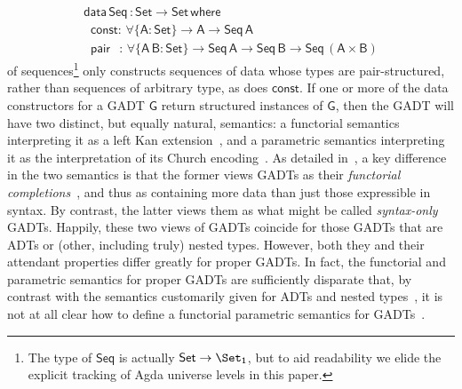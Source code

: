 \documentclass[sigplan,10pt,anonymous,review]{acmart}
\begin{document}
\begin{equation}\label{eq:seq}
\begin{array}{l}
\mathsf{data\, Seq\,: Set \to Set\,where}\\
\mathsf{\;\;const :\, \forall \{A : Set\} \to A \to Seq\,A}\\
\mathsf{\;\;pair\;\;\, :\,\forall \{A\,B : Set\} \to Seq \,A \to Seq\,B \to
  Seq\,(A \times B)}
\end{array}
\end{equation}
\noindent
of sequences\footnote{The type of $\mathsf{Seq}$ is actually
  $\mathsf{Set \to \Set_1}$, but to aid readability we elide the
  explicit tracking of Agda universe levels in this paper.} only
constructs sequences of data whose types are pair-structured, rather
than sequences of arbitrary type, as does $\mathsf{const}$. If one or
more of the data constructors for a GADT $\mathsf{G}$ return
structured instances of $\mathsf{G}$, then the GADT will have two
distinct, but equally natural, semantics: a functorial semantics
interpreting it as a left Kan extension~\cite{mac71}, and a parametric
semantics interpreting it as the interpretation of its Church
encoding~\cite{atk12,vw10}. As detailed in~\cite{jg21}, a key
difference in the two semantics is that the former views GADTs as
their {\em functorial completions}~\cite{jp19}, and thus as containing
more data than just those expressible in syntax. By contrast, the
latter views them as what might be called {\em syntax-only}
GADTs. Happily, these two views of GADTs coincide for those GADTs that
are ADTs or (other, including truly) nested types.  However, both they
and their attendant properties differ greatly for proper GADTs. In
fact, the functorial and parametric semantics for proper GADTs are
sufficiently disparate that, by contrast with the semantics
customarily given for ADTs and nested
types~\cite{bfss90,gjfor15,jgj21f}, it is not at all clear how to
define a functorial parametric semantics for GADTs~\cite{jg21}.
\end{document}
